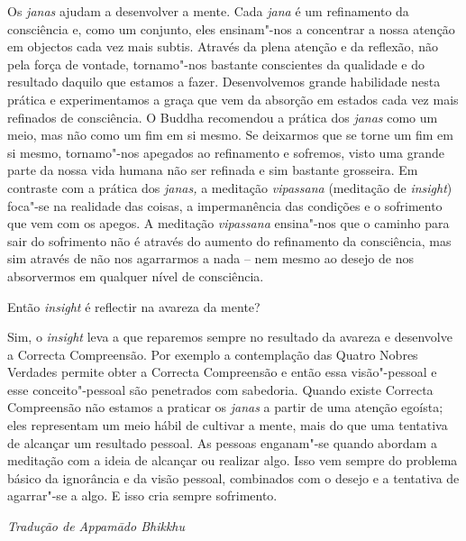  Os \emph{janas} ajudam a desenvolver a mente. Cada \emph{jana}
é um refinamento da consciência e, como um conjunto, eles ensinam"-nos a
concentrar a nossa atenção em objectos cada vez mais subtis. Através da
plena atenção e da reflexão, não pela força de vontade, tornamo"-nos
bastante conscientes da qualidade e do resultado daquilo que estamos a
fazer. Desenvolvemos grande habilidade nesta prática e experimentamos a
graça que vem da absorção em estados cada vez mais refinados de
consciência. O Buddha recomendou a prática dos \emph{janas} como um
meio, mas não como um fim em si mesmo. Se deixarmos que se torne um fim
em si mesmo, tornamo"-nos apegados ao refinamento e sofremos, visto uma
grande parte da nossa vida humana não ser refinada e sim bastante
grosseira. Em contraste com a prática dos \emph{janas,} a meditação
\emph{vipassana} (meditação de \emph{insight}) foca"-se na realidade das
coisas, a impermanência das condições e o sofrimento que vem com os
apegos. A meditação \emph{vipassana} ensina"-nos que o caminho para sair
do sofrimento não é através do aumento do refinamento da consciência,
mas sim através de não nos agarrarmos a nada -- nem mesmo ao desejo de
nos absorvermos em qualquer nível de consciência.

\bigskip

 Então \emph{insight} é reflectir na avareza da mente?

 Sim, o \emph{insight} leva a que reparemos sempre no resultado
da avareza e desenvolve a Correcta Compreensão. Por exemplo a
contemplação das Quatro Nobres Verdades permite obter a Correcta
Compreensão e então essa visão"-pessoal e esse conceito"-pessoal são
penetrados com sabedoria. Quando existe Correcta Compreensão não estamos
a praticar os \emph{janas} a partir de uma atenção egoísta; eles
representam um meio hábil de cultivar a mente, mais do que uma tentativa
de alcançar um resultado pessoal. As pessoas enganam"-se quando abordam a
meditação com a ideia de alcançar ou realizar algo. Isso vem sempre do
problema básico da ignorância e da visão pessoal, combinados com o
desejo e a tentativa de agarrar"-se a algo. E isso cria sempre
sofrimento.

\bigskip

{\raggedleft\itshape
  Tradução de Appamādo Bhikkhu
\par}